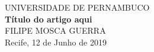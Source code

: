 \documentclass{article}
\begin{document}
  \begin{titlepage}
  \center
  \textsc{\LARGE UNIVERSIDADE DE PERNAMBUCO}\\[4cm]
  {\huge\bfseries Título do artigo aqui}\\[4cm]
  \textsc{\large FILIPE MOSCA GUERRA}\\[2cm]
  \vfill\vfill\vfill
  {\large Recife,  12 de Junho de 2019}
  \vfill
  \end{titlepage}
\end{document}
